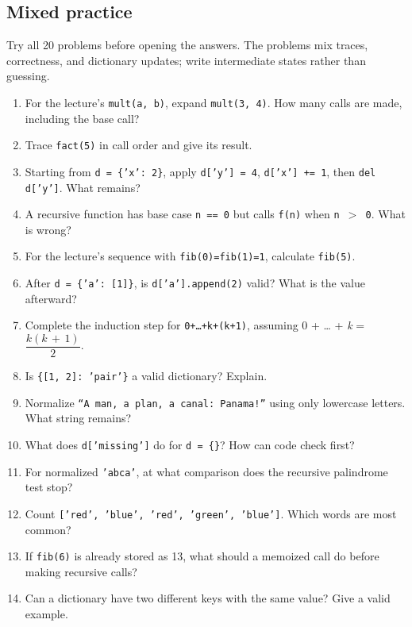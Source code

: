 \documentclass[11pt]{article}
\begin{document}
\clearpage

\begin{keepsection}
\section{Mixed practice}

Try all 20 problems before opening the answers. The problems mix traces, correctness, and dictionary updates; write intermediate states rather than guessing.

\begin{enumerate}
\item For the lecture’s \texttt{mult(a, b)}, expand \texttt{mult(3, 4)}. How many calls are made, including the base call?
\item Trace \texttt{fact(5)} in call order and give its result.
\item Starting from \texttt{d = \{'x': 2\}}, apply \texttt{d['y'] = 4}, \texttt{d['x'] += 1}, then \texttt{del d['y']}. What remains?
\item A recursive function has base case \texttt{n == 0} but calls \texttt{f(n)} when \texttt{n \ensuremath{>} 0}. What is wrong?
\item For the lecture’s sequence with \texttt{fib(0)=fib(1)=1}, calculate \texttt{fib(5)}.
\item After \texttt{d = \{'a': [1]\}}, is \texttt{d['a'].append(2)} valid? What is the value afterward?
\item Complete the induction step for \texttt{0+…+k+(k+1)}, assuming 0 + … + \textit{k} = {\small\ensuremath{\dfrac{{k}({k}\, +\, 1)}{2}}}.
\item Is \texttt{\{[1, 2]: 'pair'\}} a valid dictionary? Explain.
\item Normalize \texttt{“A man, a plan, a canal: Panama!”} using only lowercase letters. What string remains?
\item What does \texttt{d['missing']} do for \texttt{d = \{\}}? How can code check first?
\item For normalized \texttt{'abca'}, at what comparison does the recursive palindrome test stop?
\item Count \texttt{['red', 'blue', 'red', 'green', 'blue']}. Which words are most common?
\item If \texttt{fib(6)} is already stored as 13, what should a memoized call do before making recursive calls?
\item Can a dictionary have two different keys with the same value? Give a valid example.

\end{enumerate}
\end{keepsection}
\end{document}
